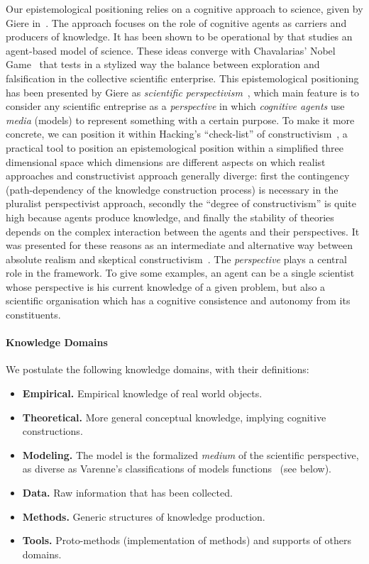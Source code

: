 \documentclass[runningheads,a4paper]{llncs2e/llncs}
\begin{document}
Our epistemological positioning relies on a cognitive approach to science, given by Giere in~\cite{giere2010explaining}. The approach focuses on the role of cognitive agents as carriers and producers of knowledge. It has been shown to be operational by \cite{giere2010agent} that studies an agent-based model of science. These ideas converge with Chavalarias' Nobel Game~\cite{chavalarias2016s} that tests in a stylized way the balance between exploration and falsification in the collective scientific enterprise. This epistemological positioning has been presented by Giere as \emph{scientific perspectivism}~\cite{giere2010scientific}, which main feature is to consider any scientific entreprise as a \emph{perspective} in which \emph{cognitive agents} use \emph{media} (models) to represent something with a certain purpose. To make it more concrete, we can position it within Hacking's ``check-list'' of constructivism~\cite{hacking1999social}, a practical tool to position an epistemological position within a simplified three dimensional space which dimensions are different aspects on which realist approaches and constructivist approach generally diverge: first the contingency (path-dependency of the knowledge construction process) is necessary in the pluralist perspectivist approach, secondly the ``degree of constructivism'' is quite high because agents produce knowledge, and finally the stability of theories depends on the complex interaction between the agents and their perspectives. It was presented for these reasons as an intermediate and alternative way between absolute realism and skeptical constructivism~\cite{brown2009models}. The \emph{perspective} plays a central role in the framework. To give some examples, an agent can be a single scientist whose perspective is his current knowledge of a given problem, but also a scientific organisation which has a cognitive consistence and autonomy from its constituents.


\paragraph{Knowledge Domains}

We postulate the following knowledge domains, with their definitions:
\begin{itemize}
\item \textbf{Empirical.} Empirical knowledge of real world objects.
\item \textbf{Theoretical.} More general conceptual knowledge, implying cognitive constructions.
\item \textbf{Modeling.} The model is the formalized \emph{medium} of the scientific perspective, as diverse as Varenne's classifications of models functions~\cite{varenne2010simulations} (see below).
\item \textbf{Data.} Raw information that has been collected.
\item \textbf{Methods.} Generic structures of knowledge production.
\item \textbf{Tools.} Proto-methods (implementation of methods) and supports of others domains.
\end{itemize}
\end{document}
